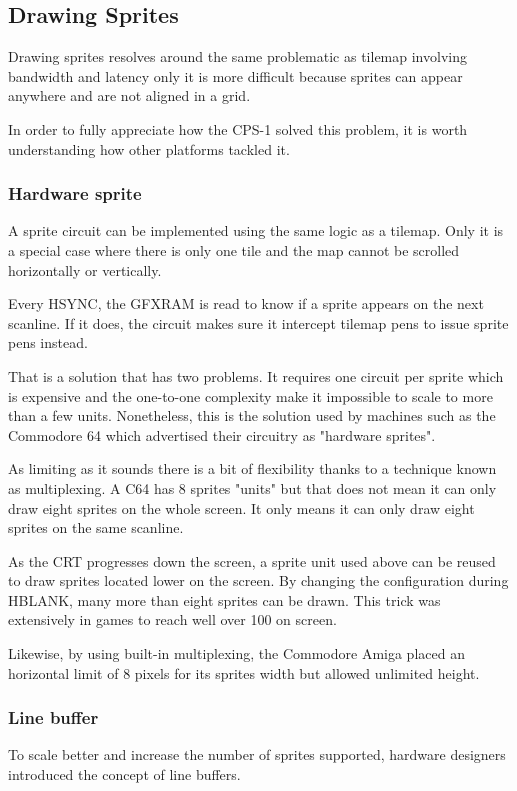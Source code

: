 \subsection{Drawing Sprites}
Drawing sprites resolves around the same problematic as tilemap involving bandwidth and latency only it is more difficult because sprites can appear anywhere and are not aligned in a grid.

In order to fully appreciate how the CPS-1 solved this problem, it is worth understanding how other platforms tackled it.

\subsubsection{Hardware sprite}
A sprite circuit can be implemented using the same logic as a tilemap. Only it is a special case where there is only one tile and the map cannot be scrolled horizontally or vertically.

Every HSYNC, the GFXRAM is read to know if a sprite appears on the next scanline. If it does, the circuit makes sure it intercept tilemap pens to issue sprite pens instead. 

That is a solution that has two problems. It requires one circuit per sprite which is expensive and the one-to-one complexity make it impossible to scale to more than a few units. Nonetheless, this is the solution used by machines such as the Commodore 64 which advertised their circuitry as "hardware sprites".


As limiting as it sounds there is a bit of flexibility thanks to a technique known as multiplexing. A C64 has 8 sprites "units" but that does not mean it can only draw eight sprites on the whole screen. It only means it can only draw eight sprites on the same scanline.

As the CRT progresses down the screen, a sprite unit used above can be reused to draw sprites located lower on the screen. By changing the configuration during HBLANK, many more than eight sprites can be drawn. This trick was extensively in games to reach well over 100 on screen.


Likewise, by using built-in multiplexing, the Commodore Amiga placed an horizontal limit of 8 pixels for its sprites width but allowed unlimited height.

\subsubsection{Line buffer}
To scale better and increase the number of sprites supported, hardware designers introduced the concept of line buffers. 

